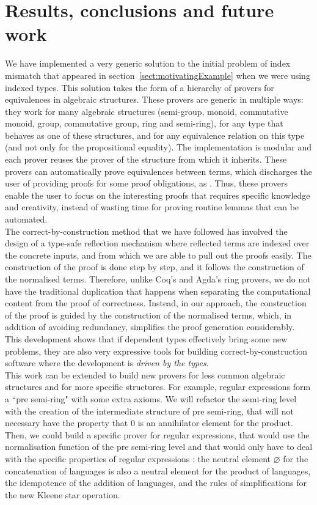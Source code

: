 \section{Results, conclusions and future work}

We have implemented a very generic solution to the initial problem of index mismatch that appeared in section~\ref{sect:motivatingExample} when we were using indexed types. This solution takes the form of a hierarchy of provers for equivalences in algebraic structures. These provers are generic in multiple ways: they work for many algebraic structures (semi-group, monoid, commutative monoid, group, commutative group, ring and semi-ring), for any type that behaves as one of these structures, and for any equivalence relation on this type (and not only for the propositional equality). The implementation is modular and each prover reuses the prover of the structure from which it inherits. These provers can automatically prove equivalences between terms, which discharges the user of providing proofs for some proof obligations, as . Thus, these provers enable the user to focus on the interesting proofs that requires specific knowledge and creativity, instead of wasting time for proving routine lemmas that can be automated.\\

The correct-by-construction method that we have followed has involved the design of a type-safe reflection mechanism where reflected terms are indexed over the concrete inputs, and from which we are able to pull out the proofs easily. The construction of the proof is done step by step, and it follows the construction of the normalised terms. Therefore, unlike Coq's and Agda's ring provers, we do not have the traditional duplication that happens when separating the computational content from the proof of correctness. Instead, in our approach, the construction of the proof is guided by the construction of the normalised terms, which, in addition of avoiding redundancy, simplifies the proof generation considerably. This development shows that if dependent types effectively bring some new problems, they are also very expressive tools for building correct-by-construction software where the development is \emph{driven by the types}. \\

This work can be extended to build new provers for less common algebraic structures and for more specific structures. For example, regular expressions form a ``pre semi-ring" with some extra axioms. We will refactor the semi-ring level with the creation of the intermediate structure of pre semi-ring, that will not necessary have the property that $0$ is an annihilator element for the product. Then, we could build a specific prover for regular expressions, that would use the normalisation function of the pre semi-ring level and that would only have to deal with the specific properties of regular expressions : the neutral element $\varnothing$ for the concatenation of languages is also a neutral element for the product of languages, the idempotence of the addition of languages, and the rules of simplifications for the new Kleene star operation.


